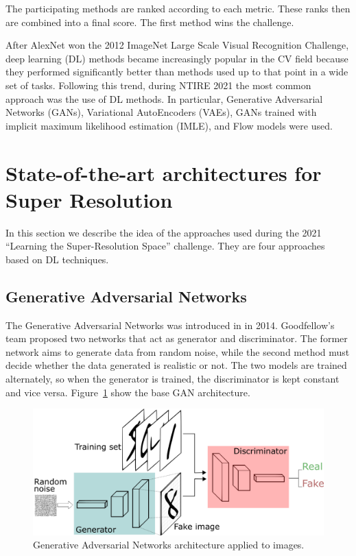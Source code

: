 \documentclass{article}
\begin{document}
\noindent The participating methods are ranked according to each metric. These ranks then are combined into a final score. The first method wins the challenge.

After AlexNet won the 2012 ImageNet Large Scale Visual Recognition Challenge, deep learning (DL) methods became increasingly popular in the CV field because they performed significantly better than methods used up to that point in a wide set of tasks. Following this trend, during NTIRE 2021 the most common approach was the use of DL methods. In particular, Generative Adversarial Networks (GANs), Variational AutoEncoders (VAEs), GANs trained with implicit maximum likelihood estimation (IMLE), and Flow models were used. \\ %



\newpage
\section{State-of-the-art architectures for Super Resolution}\label{sec:sota}
In this section we describe the idea of the approaches used during the 2021 ``Learning the Super-Resolution Space'' challenge. They are four approaches based on DL techniques.


\subsection{Generative Adversarial Networks}
The Generative Adversarial Networks was introduced in \cite{gans} in 2014. Goodfellow's team proposed two networks that act as generator and discriminator. The former network aims to generate data from random noise, while the second method must decide whether the data generated is realistic or not. The two models are trained alternately, so when the generator is trained, the discriminator is kept constant and vice versa. Figure~\ref{img:gan} show the base GAN architecture.
\begin{figure}[h]
    \centering
    \includegraphics[scale=.3]{gan.png}
    \caption{Generative Adversarial Networks architecture applied to images.}
    \label{img:gan}
\end{figure}
\end{document}
